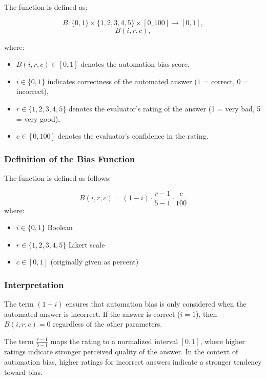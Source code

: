 \documentclass[sigconf,natbib=false]{acmart}
\begin{document}
The function is defined as:

\begin{equation*}
B : \{0,1\} \times \{1,2,3,4,5\} \times [0,100] \to [0,1],
\end{equation*}
\begin{equation*}
B(i,r,c),
\end{equation*}

where:
\begin{itemize}
    \item $B(i,r,c) \in [0,1]$ denotes the automation bias score,
    \item $i \in \{0,1\}$ indicates correctness of the automated answer
          ($1$ = correct, $0$ = incorrect),
    \item $r \in \{1,2,3,4,5\}$ denotes the evaluator's rating of the answer
          (1 = very bad, 5 = very good),
    \item $c \in [0,100]$ denotes the evaluator's confidence in the rating.
\end{itemize}

\subsubsection{Definition of the Bias Function}

The function is defined as follows:

\begin{equation}
B(i,r,c)
=
(1 - i)
\cdot
\frac{r - 1}{5 - 1}
\cdot
\frac{c}{100}
\label{eq:B}
\end{equation}
where:
\begin{itemize}
    \item \(i\in\{0,1\}\) Boolean
    \item \(r\in\{1,2,3,4,5\}\) Likert scale
    \item \(c \in [0,1]\) (originally given as percent)
\end{itemize}

\subsubsection{Interpretation}

The term $(1 - i)$ ensures that automation bias is only considered when the
automated answer is incorrect.
If the answer is correct ($i=1$), then
$B(i,r,c)=0$ regardless of the other parameters.

The term
\(
\frac{r - 1}{5-1}
\)
maps the rating to a normalized interval $[0,1]$, where higher ratings
indicate stronger perceived quality of the answer.
In the context of
automation bias, higher ratings for incorrect answers indicate a stronger
tendency toward bias.
\end{document}
